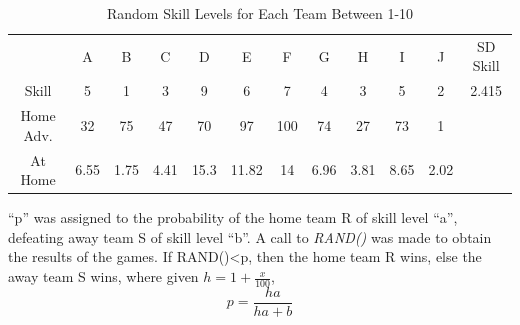 \documentclass[12pt]{article}
\begin{document}
\begin{table}[h]
\centering
\begin{tabular}{cccccccccccc}
          & A    & B    & C    & D    & E     & F   & G    & H    & I    & J    & SD Skill \\
Skill     & 5    & 1    & 3    & 9    & 6     & 7   & 4    & 3    & 5    & 2    & 2.415    \\
Home Adv. & 32   & 75   & 47   & 70   & 97    & 100 & 74   & 27   & 73   & 1    &          \\
At Home   & 6.55 & 1.75 & 4.41 & 15.3 & 11.82 & 14  & 6.96 & 3.81 & 8.65 & 2.02 &         
\end{tabular}
\caption{Random Skill Levels for Each Team Between 1-10}
\end{table}

“p” was assigned to the probability of the home team R of skill level “a”, defeating away team S of skill level “b”. A call to \emph{RAND()} was made to obtain the results of the games. If RAND()\textless p, then the home team R wins, else the away team S wins, where given $h=1+\frac{x}{100}$, $$p=\frac{ha}{ha+b}$$ 
\end{document}

